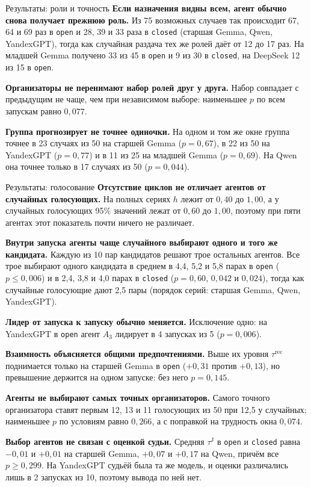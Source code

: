 \documentclass[aspectratio=169,11pt]{beamer}
\begin{document}
\begin{frame}{Результаты: роли и точность}
\small
\textbf{Если назначения видны всем, агент обычно снова получает прежнюю роль.} Из 75 возможных случаев так происходит 67, 64 и 69 раз в \texttt{open} и 28, 39 и 33 раза в \texttt{closed} (старшая Gemma, Qwen, YandexGPT), тогда как случайная раздача тех же ролей даёт от 12 до 17 раз. На младшей Gemma получено 33 из 45 в \texttt{open} и 9 из 30 в \texttt{closed}, на DeepSeek 12 из 15 в \texttt{open}.

\medskip
\textbf{Организаторы не перенимают набор ролей друг у друга.} Набор совпадает с предыдущим не чаще, чем при независимом выборе: наименьшее $p$ по всем запускам равно $0{,}077$.

\medskip
\textbf{Группа прогнозирует не точнее одиночки.} На одном и том же окне группа точнее в 23 случаях из 50 на старшей Gemma ($p=0{,}67$), в 22 из 50 на YandexGPT ($p=0{,}77$) и в 11 из 25 на младшей Gemma ($p=0{,}69$). На Qwen она точнее только в 17 случаях из 50 ($p=0{,}044$).
\end{frame}

\begin{frame}{Результаты: голосование}
\footnotesize
\textbf{Отсутствие циклов не отличает агентов от случайных голосующих.} На полных сериях $h$ лежит от $0{,}40$ до $1{,}00$, а у случайных голосующих 95\% значений лежат от $0{,}60$ до $1{,}00$, поэтому при пяти агентах этот показатель почти ничего не различает.

\smallskip
\textbf{Внутри запуска агенты чаще случайного выбирают одного и того же кандидата.} Каждую из 10 пар кандидатов решают трое остальных агентов. Все трое выбирают одного кандидата в среднем в 4{,}4, 5{,}2 и 5{,}8 парах в \texttt{open} ($p\le 0{,}006$) и в 2{,}4, 3{,}8 и 4{,}0 парах в \texttt{closed} ($p=0{,}60$, $0{,}042$ и $0{,}024$), тогда как случайные голосующие дают 2{,}5 пары (порядок серий: старшая Gemma, Qwen, YandexGPT).

\smallskip
\textbf{Лидер от запуска к запуску обычно меняется.} Исключение одно: на YandexGPT в \texttt{open} агент $A_3$ лидирует в 4 запусках из 5 ($p=0{,}006$).

\smallskip
\textbf{Взаимность объясняется общими предпочтениями.} Выше их уровня $\tau^{\mathrm{rec}}$ поднимается только на старшей Gemma в \texttt{open} ($+0{,}31$ против $+0{,}13$), но превышение держится на одном запуске: без него $p=0{,}145$.

\smallskip
\textbf{Агенты не выбирают самых точных организаторов.} Самого точного организатора ставят первым 12, 13 и 11 голосующих из 50 при 12{,}5 у случайных; наименьшее $p$ по условиям равно $0{,}266$, а с поправкой на трудность окна $0{,}074$.

\smallskip
\textbf{Выбор агентов не связан с оценкой судьи.} Средняя $\tau^{\mathrm J}$ в \texttt{open} и \texttt{closed} равна $-0{,}01$ и $+0{,}01$ на старшей Gemma, $+0{,}07$ и $+0{,}17$ на Qwen, причём все $p\ge 0{,}299$. На YandexGPT судьёй была та же модель, и оценки различались лишь в 2 запусках из 10, поэтому вывода по ней нет.
\end{frame}
\end{document}
